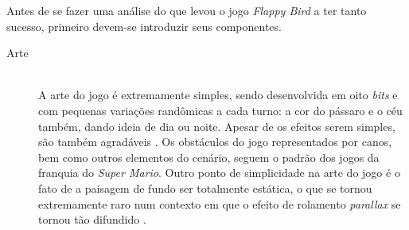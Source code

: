 Antes de se fazer uma análise do que levou o jogo \textit{Flappy Bird} a ter tanto sucesso, primeiro devem-se introduzir seus componentes.

\begin{description}
  \item[Arte] \hfill \\
  A arte do jogo é extremamente simples, sendo desenvolvida em oito \textit{bits} e com pequenas variações randômicas a cada turno: a cor do pássaro e o céu também, dando ideia de dia ou noite. Apesar de os efeitos serem simples, são também agradáveis \cite{Eldic2014}. Os obstáculos do jogo representados por canos, bem como outros elementos do cenário, seguem o padrão dos jogos da franquia do \textit{Super Mario}. Outro ponto de simplicidade na arte do jogo é o fato de a paisagem de fundo ser totalmente estática, o que se tornou extremamente raro num contexto em que o efeito de rolamento \textit{parallax} se tornou tão difundido \cite{Eldic2014}.
\end{description}